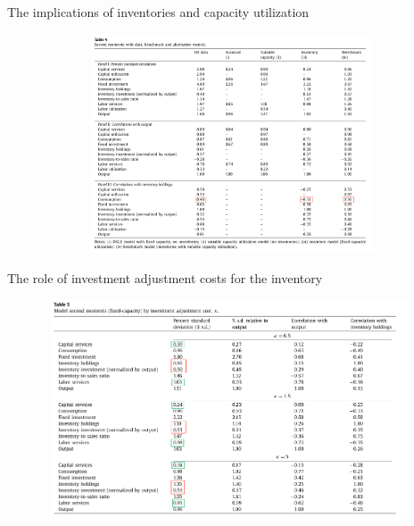 \documentclass[fontset=windows,12pt,t,aspectratio=169]{beamer}
\begin{document}
\begin{frame}{The implications of inventories and capacity utilization}
	\begin{figure}
		\includegraphics[width=12cm,height=6.5cm]{table/tab4.png}
	\end{figure}
\end{frame}

\begin{frame}{The role of investment adjustment costs for the inventory}
	\begin{figure}
		\includegraphics[width=11cm,height=6.5cm]{table/tab5.png}
	\end{figure}
\end{frame}

\end{document}
